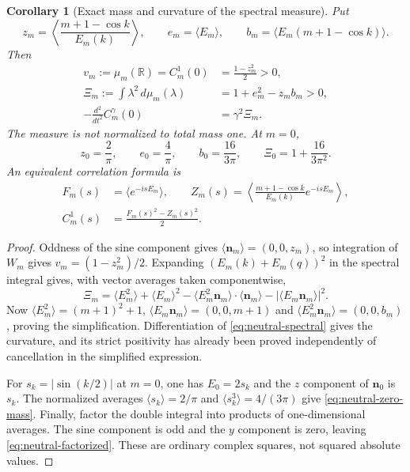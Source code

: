 \documentclass[11pt]{article}
\newtheorem{corollary}[theorem]{Corollary}
\theoremstyle{definition}
\begin{document}
\begin{corollary}[Exact mass and curvature of the spectral measure]
\label{cor:neutral-curvature}
Put
\[
 z_m=\left\langle\frac{m+1-\cos k}{E_m(k)}\right\rangle,
 \qquad e_m=\langle E_m\rangle,
 \qquad b_m=\langle E_m(m+1-\cos k)\rangle.
\]
Then
\begin{equation}
 \begin{split}
 v_m:=\mu_m(\mathbb R)=C_m^1(0)&=\frac{1-z_m^2}{2}>0,\\
 \Xi_m:=\int\lambda^2\,d\mu_m(\lambda)
   &=1+e_m^2-z_mb_m>0,\\
 -\frac{d^2}{dt^2}C_m^\gamma(0)&=\gamma^2\Xi_m.
 \end{split}
 \label{eq:neutral-moments}
\end{equation}
The measure is not normalized to total mass one. At $m=0$,
\begin{equation}
 z_0=\frac2\pi,\qquad e_0=\frac4\pi,
 \qquad b_0=\frac{16}{3\pi},
 \qquad \Xi_0=1+\frac{16}{3\pi^2}.
 \label{eq:neutral-zero-mass}
\end{equation}
An equivalent correlation formula is
\begin{equation}
 \begin{split}
 F_m(s)&=\langle e^{-isE_m}\rangle,\qquad
 Z_m(s)=\left\langle\frac{m+1-\cos k}{E_m(k)}e^{-isE_m}\right\rangle,\\
 C_m^1(s)&=\frac{F_m(s)^2-Z_m(s)^2}{2}.
 \end{split}
 \label{eq:neutral-factorized}
\end{equation}
\end{corollary}
\begin{proof}
Oddness of the sine component gives
$\langle\boldsymbol n_m\rangle=(0,0,z_m)$, so integration of $W_m$ gives
$v_m=(1-z_m^2)/2$. Expanding $(E_m(k)+E_m(q))^2$ in the spectral integral
gives, with vector averages taken componentwise,
\[
 \Xi_m=\langle E_m^2\rangle+\langle E_m\rangle^2
   -\langle E_m^2\boldsymbol n_m\rangle\cdot
          \langle\boldsymbol n_m\rangle
   -|\langle E_m\boldsymbol n_m\rangle|^2.
\]
Now $\langle E_m^2\rangle=(m+1)^2+1$,
$\langle E_m\boldsymbol n_m\rangle=(0,0,m+1)$ and
$\langle E_m^2\boldsymbol n_m\rangle=(0,0,b_m)$, proving the simplification.
Differentiation of \eqref{eq:neutral-spectral} gives the curvature, and its
strict positivity has already been proved independently of cancellation
in the simplified expression.

For $s_k=|\sin(k/2)|$ at $m=0$, one has
$E_0=2s_k$ and the $z$ component of $\boldsymbol n_0$ is $s_k$.
The normalized averages
$\langle s_k\rangle=2/\pi$ and
$\langle s_k^3\rangle=4/(3\pi)$ give
\eqref{eq:neutral-zero-mass}. Finally, factor the double integral into
products of one-dimensional averages. The sine component is odd and the
$y$ component is zero, leaving \eqref{eq:neutral-factorized}. These are
ordinary complex squares, not squared absolute values.
\end{proof}
\end{document}
